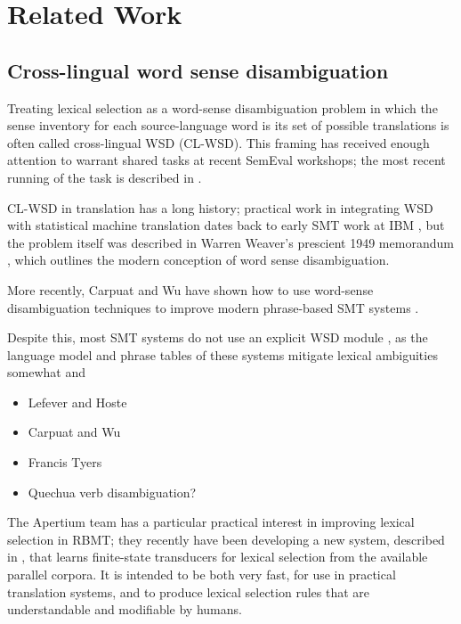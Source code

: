 \section{Related Work}

\subsection{Cross-lingual word sense disambiguation}

Treating lexical selection as a word-sense disambiguation problem in which the
sense inventory for each source-language word is its set of possible
translations is often called cross-lingual WSD (CL-WSD). This framing has
received enough attention to warrant shared tasks at recent SemEval workshops;
the most recent running of the task is described in \cite{task10}.

CL-WSD in translation has a long history; practical work in integrating
WSD with statistical machine translation dates back to early SMT work at IBM
\cite{Brown91word-sensedisambiguation}, but the problem itself was described in
Warren Weaver's prescient 1949 memorandum \cite{weavermemo}, which outlines the
modern conception of word sense disambiguation.

More recently, Carpuat and Wu have shown how to use word-sense disambiguation
techniques to improve modern phrase-based SMT systems \cite{carpuatpsd}.

Despite this, most SMT systems do not use an explicit WSD module
\cite{wsdchap3}, as the language model and phrase tables of these systems
mitigate lexical ambiguities somewhat and 



\cite{carpuat2008evaluation}

\cite{carpuat-wu:2007:EMNLP-CoNLL2007}

\begin{itemize}
  \item Lefever and Hoste
  \item Carpuat and Wu
  \item Francis Tyers \cite{tyers-fst}
  \item Quechua verb disambiguation?
\end{itemize}


The Apertium team has a particular practical interest in improving lexical
selection in RBMT; they recently have been developing
a new system, described in \cite{tyers-fst}, that learns finite-state
transducers for lexical selection from the available parallel corpora. It is
intended to be both very fast, for use in practical translation systems, and
to produce lexical selection rules that are understandable and modifiable by
humans.


